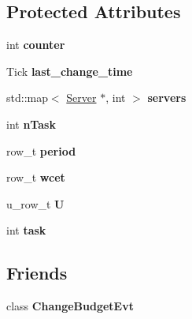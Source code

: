 \subsection*{Protected Attributes}
\begin{DoxyCompactItemize}
\item 
int {\bfseries counter}\hypertarget{classRTSim_1_1SuperCBS_a3fdfd4f51b7df68c11c056b9d93d148f}{}\label{classRTSim_1_1SuperCBS_a3fdfd4f51b7df68c11c056b9d93d148f}

\item 
Tick {\bfseries last\+\_\+change\+\_\+time}\hypertarget{classRTSim_1_1SuperCBS_af7af544a8eecb734866a36dc8aa725af}{}\label{classRTSim_1_1SuperCBS_af7af544a8eecb734866a36dc8aa725af}

\item 
std\+::map$<$ \hyperlink{classRTSim_1_1Server}{Server} $\ast$, int $>$ {\bfseries servers}\hypertarget{classRTSim_1_1SuperCBS_aaaf76bb4645c754b3bee9066b653d4d1}{}\label{classRTSim_1_1SuperCBS_aaaf76bb4645c754b3bee9066b653d4d1}

\item 
int {\bfseries n\+Task}\hypertarget{classRTSim_1_1SuperCBS_a8018271d5899c5e54d8ce317864bd10b}{}\label{classRTSim_1_1SuperCBS_a8018271d5899c5e54d8ce317864bd10b}

\item 
row\+\_\+t {\bfseries period}\hypertarget{classRTSim_1_1SuperCBS_a9d1acbebb10c3dc18dd038e89ca3c289}{}\label{classRTSim_1_1SuperCBS_a9d1acbebb10c3dc18dd038e89ca3c289}

\item 
row\+\_\+t {\bfseries wcet}\hypertarget{classRTSim_1_1SuperCBS_a140449cf07340e47ee36df8fe8b35379}{}\label{classRTSim_1_1SuperCBS_a140449cf07340e47ee36df8fe8b35379}

\item 
u\+\_\+row\+\_\+t {\bfseries U}\hypertarget{classRTSim_1_1SuperCBS_a363afee83e3823396b4387f71d9ffe57}{}\label{classRTSim_1_1SuperCBS_a363afee83e3823396b4387f71d9ffe57}

\item 
int {\bfseries task}\hypertarget{classRTSim_1_1SuperCBS_a66c8bd37151621110e5a9d1edc5b4a3e}{}\label{classRTSim_1_1SuperCBS_a66c8bd37151621110e5a9d1edc5b4a3e}

\end{DoxyCompactItemize}
\subsection*{Friends}
\begin{DoxyCompactItemize}
\item 
class {\bfseries Change\+Budget\+Evt}\hypertarget{classRTSim_1_1SuperCBS_abf46210d564ea7de60da68280c259620}{}\label{classRTSim_1_1SuperCBS_abf46210d564ea7de60da68280c259620}

\end{DoxyCompactItemize}


